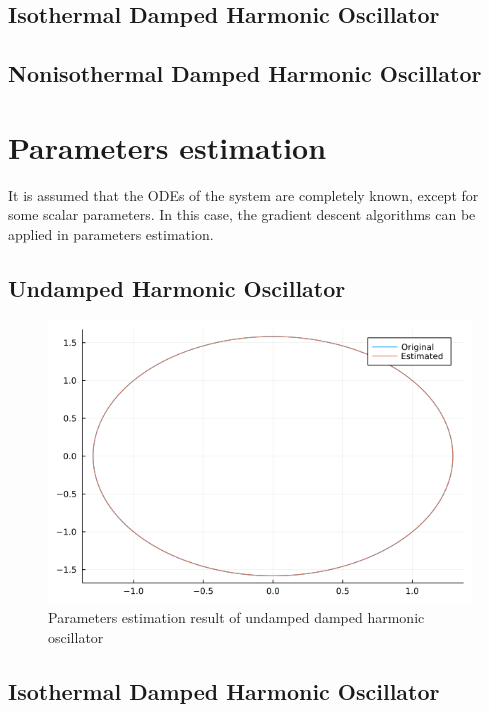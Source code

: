 \subsection{Isothermal Damped Harmonic Oscillator}

\subsection{Nonisothermal Damped Harmonic Oscillator}


\clearpage
\section{Parameters estimation}
It is assumed that the ODEs of the system are completely known, except for some scalar parameters. In this case, the gradient descent algorithms can be applied in parameters estimation.
\subsection{Undamped Harmonic Oscillator}

\begin{figure}[h!]
    \centering
    \includegraphics[scale=0.5]{figures/4_Params_Estimation/1_params_estimation_result.png}
    \caption{Parameters estimation result of undamped damped harmonic oscillator}
    \label{fig:params_est_udho}
\end{figure}


\clearpage
\subsection{Isothermal Damped Harmonic Oscillator}

